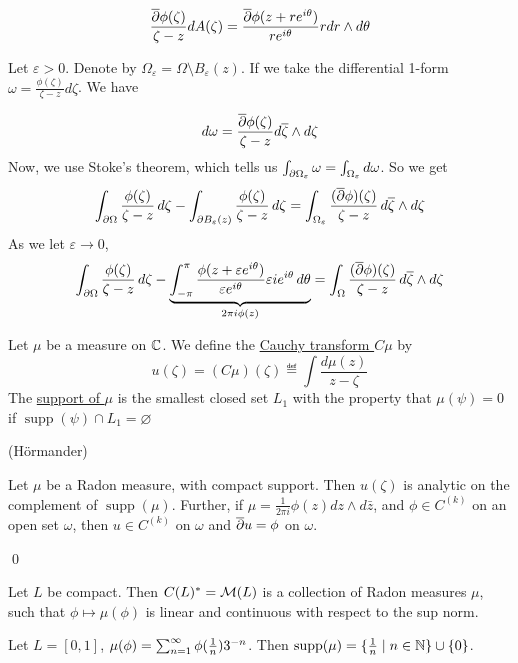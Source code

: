 \documentclass[x11names,reqno,14pt]{extarticle}
\DeclareMathOperator{\supp}{supp}
\begin{document}
\[
\frac{\overline{\partial}\phi(\zeta)}{\zeta - z}dA(\zeta) = \frac{\overline{\partial}\phi(z + re^{i\theta})}{re^{i\theta}}rdr\wedge d\theta
\]

Let $\varepsilon>0$. Denote by $\Omega_\varepsilon = \Omega\setminus B_{\varepsilon}(z)$. If we take the differential 1-form $\omega = \frac{\phi(\zeta)}{\zeta - z}d\zeta$. We have 

\[
d\omega = \frac{\overline{\partial}\phi(\zeta)}{\zeta - z}d\overline{\zeta}\wedge d\zeta
\]
Now, we use Stoke's theorem, which tells us $\int_{\partial\Omega_\varepsilon}\omega = \int_{\Omega_\varepsilon}d\omega$. So we get
\[
\int_{\partial\Omega}\frac{\phi(\zeta)}{\zeta - z}\,d\zeta - \int_{\partial B_{\varepsilon}(z)}\frac{\phi(\zeta)}{\zeta - z}\,d\zeta = \int_{\Omega_\varepsilon}\frac{(\overline{\partial}\phi)(\zeta)}{\zeta - z}\,d\overline{\zeta}\wedge d\zeta
\]
As we let $\varepsilon\to 0$, 
\[
\int_{\partial\Omega}\frac{\phi(\zeta)}{\zeta - z}\,d\zeta - \underbrace{\int_{-\pi}^{\pi}\frac{\phi(z + \varepsilon e^{i\theta})}{\varepsilon e^{i\theta}}\varepsilon ie^{i\theta}\,d\theta}_{2\pi i \phi(z)} = \int_{\Omega}\frac{(\overline{\partial}\phi)(\zeta)}{\zeta - z}\,d\overline{\zeta}\wedge d\zeta
\]

 Let $\mu$ be a measure on $\mathbb{C}$. We define the \underline{Cauchy transform $C\mu$} by
\[
u(\zeta) = (C\mu)(\zeta) \eqdef \int\frac{d\mu(z)}{z - \zeta}
\]
The \underline{support of $\mu$} is the smallest closed set $L_1$ with the property that $\mu(\psi) = 0$ if $\supp(\psi) \cap L_1 = \varnothing$


\thm (H\"ormander)

Let $\mu$ be a Radon measure, with compact support. Then $u(\zeta)$ is analytic on the complement of $\supp(\mu)$. Further, if $\mu = \frac{1}{2\pi i }\phi(z)dz\wedge d\bar{z}$, and $\phi\in C^{(k)}$ on an open set $\omega$, then $u \in C^{(k)}$ on $\omega$ and $\overline{\partial}u = \phi$ on $\omega$. 

\proof

\qed

Let $L$ be compact. Then $C(L)^* = \mathcal{M}(L)$ is a collection of Radon measures $\mu$, such that $\phi\mapsto\mu(\phi)$ is linear and continuous with respect to the sup norm.

\exm Let $L = [0, 1]$, $\mu(\phi) = \sum_{n=1}^{\infty}\phi(\frac{1}{n})3^{-n}$. Then $\supp(\mu) = \{\frac{1}{n} \mid n \in \N\} \cup\{0\}$. 
\end{document}

